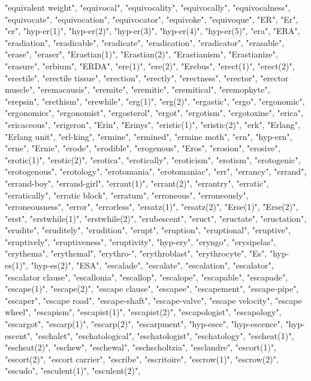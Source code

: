 "equivalent weight",
"equivocal",
"equivocality",
"equivocally",
"equivocalness",
"equivocate",
"equivocation",
"equivocator",
"equivoke",
"equivoque",
"ER",
"Er",
"er",
"hyp-er(1)",
"hyp-er(2)",
"hyp-er(3)",
"hyp-er(4)",
"hyp-er(5)",
"era",
"ERA",
"eradiation",
"eradicable",
"eradicate",
"eradication",
"eradicator",
"erasable",
"erase",
"eraser",
"Erastian(1)",
"Erastian(2)",
"Erastianism",
"Erastianize",
"erasure",
"erbium",
"ERDA",
"ere(1)",
"ere(2)",
"Erebus",
"erect(1)",
"erect(2)",
"erectile",
"erectile tissue",
"erection",
"erectly",
"erectness",
"erector",
"erector muscle",
"eremacausis",
"eremite",
"eremitic",
"eremitical",
"eremophyte",
"erepsin",
"erethism",
"erewhile",
"erg(1)",
"erg(2)",
"ergastic",
"ergo",
"ergonomic",
"ergonomics",
"ergonomist",
"ergosterol",
"ergot",
"ergotism",
"ergotoxine",
"erica",
"ericaceous",
"erigeron",
"Erin",
"Erinys",
"eristic(1)",
"eristic(2)",
"erk",
"Erlang",
"Erlang unit",
"erl-king",
"ermine",
"ermined",
"ermine moth",
"ern",
"hyp-ern",
"erne",
"Ernie",
"erode",
"erodible",
"erogenous",
"Eros",
"erosion",
"erosive",
"erotic(1)",
"erotic(2)",
"erotica",
"erotically",
"eroticism",
"erotism",
"erotogenic",
"erotogenous",
"erotology",
"erotomania",
"erotomaniac",
"err",
"errancy",
"errand",
"errand-boy",
"errand-girl",
"errant(1)",
"errant(2)",
"errantry",
"erratic",
"erratically",
"erratic block",
"erratum",
"erroneous",
"erroneously",
"erroneousness",
"error",
"errorless",
"ersatz(1)",
"ersatz(2)",
"Erse(1)",
"Erse(2)",
"erst",
"erstwhile(1)",
"erstwhile(2)",
"erubescent",
"eruct",
"eructate",
"eructation",
"erudite",
"eruditely",
"erudition",
"erupt",
"eruption",
"eruptional",
"eruptive",
"eruptively",
"eruptiveness",
"eruptivity",
"hyp-ery",
"eryngo",
"erysipelas",
"erythema",
"erythemal",
"erythro-",
"erythroblast",
"erythrocyte",
"Es",
"hyp-es(1)",
"hyp-es(2)",
"ESA",
"escalade",
"escalate",
"escalation",
"escalator",
"escalator clause",
"escallonia",
"escallop",
"escalope",
"escapable",
"escapade",
"escape(1)",
"escape(2)",
"escape clause",
"escapee",
"escapement",
"escape-pipe",
"escaper",
"escape road",
"escape-shaft",
"escape-valve",
"escape velocity",
"escape wheel",
"escapism",
"escapist(1)",
"escapist(2)",
"escapologist",
"escapology",
"escargot",
"escarp(1)",
"escarp(2)",
"escarpment",
"hyp-esce",
"hyp-escence",
"hyp-escent",
"eschalet",
"eschatological",
"eschatologist",
"eschatology",
"escheat(1)",
"escheat(2)",
"eschew",
"eschewal",
"eschscholtzia",
"esclandre",
"escort(1)",
"escort(2)",
"escort carrier",
"escribe",
"escritoire",
"escrow(1)",
"escrow(2)",
"escudo",
"esculent(1)",
"esculent(2)",
